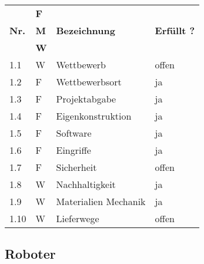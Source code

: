 \documentclass[main.tex]{subfiles} %
\begin{document}
\begin{tabular}{|l|p{0.5cm}|p{4cm}|p{10cm}|}
  \hline
               & \textbf{F} &                      &                    \\
  \textbf{Nr.} & \textbf{M} & \textbf{Bezeichnung} & \textbf{Erfüllt ?} \\
               & \textbf{W} &                      &                    \\
  \hline
  1.1          & W          & Wettbewerb           & offen              \\
  1.2          & F          & Wettbewerbsort       & ja                 \\
  1.3          & F          & Projektabgabe        & ja                 \\
  1.4          & F          & Eigenkonstruktion    & ja                 \\
  1.5          & F          & Software             & ja                 \\
  1.6          & F          & Eingriffe            & ja                 \\
  1.7          & F          & Sicherheit           & offen              \\
  1.8          & W          & Nachhaltigkeit       & ja                 \\
  1.9          & W          & Materialien Mechanik & ja                 \\
  1.10         & W          & Lieferwege           & offen              \\
  \hline
\end{tabular}

\subsection*{Roboter}
\end{document}
